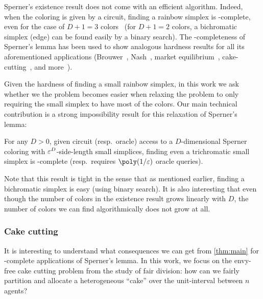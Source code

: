 \documentclass[letterpaper,11pt]{article}
\begin{document}
Sperner's existence result does not come with an efficient algorithm. Indeed, when the coloring is given by a circuit, finding a rainbow simplex is \PPAD-complete, even for the case of $D+1=3$ colors~\cite{DBLP:journals/tcs/ChenD09} (for $D+1=2$ colors, a bichromatic simplex (edge) can be found easily by a binary search). The \PPAD-completeness of Sperner's lemma has been used to show analogous hardness results for all its aforementioned applications (Brouwer~\cite{DBLP:journals/jcss/Papadimitriou94}, Nash~\cite{DBLP:journals/siamcomp/DaskalakisGP09}, market equilibrium~\cite{DBLP:journals/jacm/VaziraniY11,DBLP:journals/jacm/ChenPY17}, cake-cutting~\cite{DBLP:journals/ior/DengQS12,DBLP:conf/focs/HollenderR23}, and more~\cite{DBLP:conf/focs/KintaliPRST09,DBLP:journals/teco/OthmanPR16,DBLP:journals/jcss/GoldbergH21}). 

Given the hardness of finding a small rainbow simplex, in this work we ask whether we the problem becomes easier when relaxing the problem to only requiring the small simplex to have most of the colors. Our main technical contribution is a strong impossibility result for this relaxation of Sperner's lemma:
\begin{theorem}
For any $D>0$, given circuit (resp.~oracle) access to a $D$-dimensional Sperner coloring with $\varepsilon^D$-side-length small simplices, finding even a trichromatic small simplex is \PPAD-complete (resp.~requires $\poly(1/\eps)$ oracle queries).
\end{theorem}
Note that this result is tight in the sense that as mentioned earlier, finding a bichromatic simplex is easy (using binary search). It is also interesting that even though the number of colors in the existence result grows linearly with $D$, the number of colors we can find algorithmically does not grow at all.

\subsubsection*{Cake cutting}

It is interesting to understand what consequences we can get from \cref{thm:main} for \PPAD-complete applications of Sperner's lemma. In this work, we focus on the envy-free cake cutting problem from the study of fair division: how can we fairly partition and allocate a heterogeneous ``cake'' over the unit-interval between $n$ agents?
\end{document}
